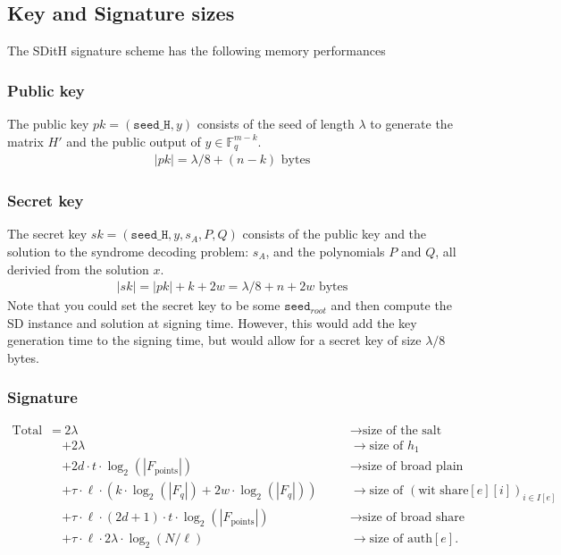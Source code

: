 \documentclass[11pt]{report}
\theoremstyle{definition}
\theoremstyle{plain}
\begin{document}
\subsection{Key and Signature sizes}

The SDitH signature scheme has the following memory performances

\subsubsection{Public key}
The public key $pk = (\texttt{seed\_H}, y)$ consists of the seed of length $\lambda$ to generate the matrix $H'$ and the public output of $y \in \mathbb{F}_q^{m-k}$.
\begin{align*}
  |pk| = \lambda / 8 + (n - k) \text{ bytes}
\end{align*}

\subsubsection{Secret key}
The secret key $sk = (\texttt{seed\_H}, y, s_A, P, Q)$ consists of the public key and the solution to the syndrome decoding problem: $s_A$, and the polynomials $P$ and $Q$, all derivied from the solution $x$.
\begin{align*}
  |sk| = |pk| + k + 2w = \lambda/8 + n + 2w \text{ bytes}
\end{align*}
Note that you could set the secret key to be some $\texttt{seed}_{root}$ and then compute the SD instance and solution at signing time. However, this would add the key generation time to the signing time, but would allow for a secret key of size $\lambda/8$ bytes.
\subsubsection{Signature}
\begin{align*}
  \text{Total Size} =
   & \ 2\lambda \quad                                                                 &  & \rightarrow \text{size of the salt}                               \\
   & + 2\lambda \quad                                                                 &  & \rightarrow \text{size of } h_1                                   \\
   & + 2d \cdot t \cdot \log_2(|F_{\text{points}}|) \quad                             &  & \rightarrow \text{size of broad plain}                            \\
   & + \tau \cdot \ell \cdot (k \cdot \log_2(|F_q|) + 2w \cdot \log_2(|F_q|)) \quad   &  & \rightarrow \text{size of } (\text{wit share}[e][i])_{i \in I[e]} \\
   & + \tau \cdot \ell \cdot (2d + 1) \cdot t \cdot \log_2(|F_{\text{points}}|) \quad &  & \rightarrow \text{size of broad share}                            \\
   & + \tau \cdot \ell \cdot 2\lambda \cdot \log_2(N / \ell) \quad                    &  & \rightarrow \text{size of } \text{auth}[e].
\end{align*}
\end{document}
